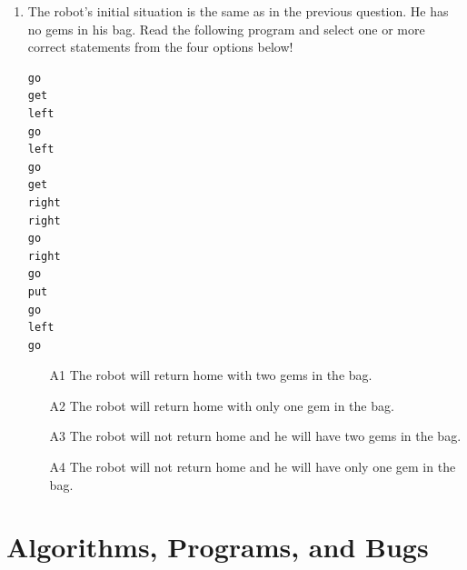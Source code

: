 \documentclass[article,A4,12pt]{llncs}
\begin{document}
\begin{enumerate}
\begin{enumerate}
\end{enumerate}
\item The robot's initial situation is the same as in the previous question. He has no gems 
in his bag. Read the following program and select one or more correct statements from the four options below!
\begin{verbatim}
go
get
left
go
left
go
get
right
right
go
right
go
put
go
left 
go
\end{verbatim}
\begin{enumerate}
\item[A1] The robot will return home with two gems in the bag.
\item[A2] The robot will return home with only one gem in the bag.
\item[A3] The robot will not return home and he will have two gems in the bag.
\item[A4] The robot will not return home and he will have only one gem in the bag.
\end{enumerate}
\end{enumerate}


\section{Algorithms, Programs, and Bugs}
\end{document}
